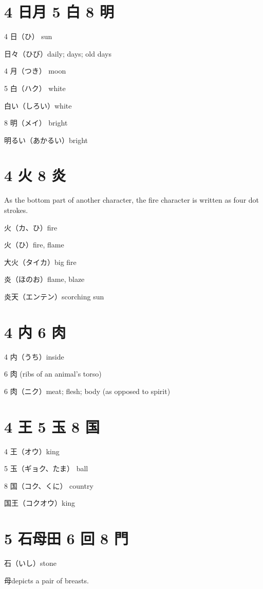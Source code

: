 \section{4 日月 5 白 8 明}

4 日（ひ） sun

日々（ひび）daily; days; old days

4 月（つき） moon

5 白（ハク） white

白い（しろい）white

8 明（メイ） bright

明るい（あかるい）bright

\section{4 火 8 炎}

As the bottom part of another character,
the fire character is written as four dot strokes.

火（カ、ひ）fire

火（ひ）fire, flame

大火（タイカ）big fire

炎（ほのお）flame, blaze

炎天（エンテン）scorching sun

\section{4 内 6 肉}

4 内（うち）inside

6 肉 (ribs of an animal's torso)

6 肉（ニク）meat; flesh; body (as opposed to spirit)

\section{4 王 5 玉 8 国}

4 王（オウ）king

5 玉（ギョク、たま） ball

8 国（コク、くに） country

国王（コクオウ）king

\section{5 石母田 6 回 8 門}

石（いし）stone

母depicts a pair of breasts.

